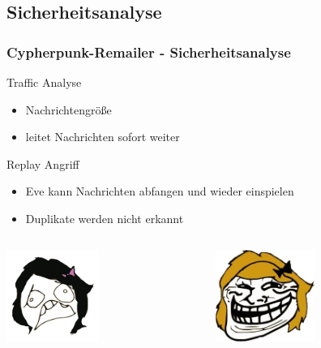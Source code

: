 \documentclass{beamer}
\begin{document}
\subsection{Sicherheitsanalyse}
\begin{frame}
	\frametitle{Cypherpunk-Remailer - Sicherheitsanalyse}
	\begin{alertblock}{Traffic Analyse}	
		\begin{itemize}	
			\item Nachrichtengröße
			\item leitet Nachrichten sofort weiter
		\end{itemize}	
	\end{alertblock}

	\begin{alertblock}{Replay Angriff}	
		\begin{itemize}	
			\item Eve kann Nachrichten abfangen und wieder einspielen
			\item Duplikate werden nicht erkannt
		\end{itemize}	
	\end{alertblock}

	\begin{columns}[T]
		\begin{column}[T]{5cm}
			\begin{center}
				\includegraphics[height=3cm]{bilder/alice_sad.jpg}
			\end{center}
		\end{column}
		\begin{column}[T]{5cm}
			\begin{center}	
				\includegraphics[height=3cm]{bilder/eve.jpg}
			\end{center}
		\end{column}
	\end{columns}	
\end{frame}
\end{document}
